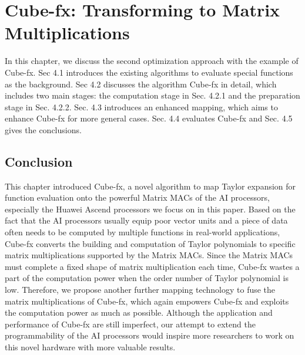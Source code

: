 \chapter{Cube-fx: Transforming to Matrix Multiplications}
\label{sec_4}

In this chapter, we discuss the second optimization approach with the example of Cube-fx. Sec 4.1 introduces the existing algorithms to evaluate special functions as the background. Sec 4.2 discusses the algorithm Cube-fx in detail, which includes two main stages: the computation stage in Sec. 4.2.1 and the preparation stage in Sec. 4.2.2. Sec. 4.3 introduces an enhanced mapping, which aims to enhance Cube-fx for more general cases. Sec. 4.4 evaluates Cube-fx and Sec. 4.5 gives the conclusions.


\section{Conclusion \label{sec:8}}

This chapter introduced Cube-fx, a novel algorithm to map Taylor expansion for function evaluation onto the powerful Matrix MACs of the AI processors, especially the Huawei Ascend processors we focus on in this paper. Based on the fact that the AI processors usually equip poor vector units and a piece of data often needs to be computed by multiple functions in real-world applications, Cube-fx converts the building and computation of Taylor polynomials to specific matrix multiplications supported by the Matrix MACs. Since the Matrix MACs must complete a fixed shape of matrix multiplication each time, Cube-fx wastes a part of the computation power when the order number of Taylor polynomial is low. Therefore, we propose another further mapping technology to fuse the matrix multiplications of Cube-fx, which again empowers Cube-fx and exploits the computation power as much as possible. Although the application and performance of Cube-fx are still imperfect, our attempt to extend the programmability of the AI processors would inspire more researchers to work on this novel hardware with more valuable results.